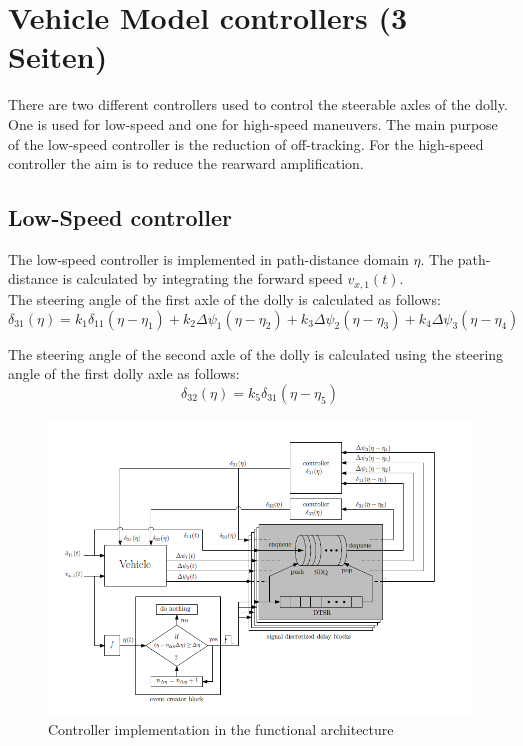 \documentclass[ExampleMasters.tex]{subfiles}
\begin{document}
\clearpage
\chapter{Vehicle Model controllers (3 Seiten)}
\label{chap:steering_model}
There are two different controllers used to control the steerable axles of the dolly. One is used for low-speed and one for high-speed maneuvers. The main purpose of the low-speed controller is the reduction of off-tracking.
For the high-speed controller the aim is to reduce the rearward amplification.
\section{Low-Speed controller}
\label{sec:low-speed_controller}
The low-speed controller is implemented in path-distance domain $\eta$. The path-distance is calculated by integrating the forward speed $v_{x,1}(t)$. \\
The steering angle of the first axle of the dolly is calculated as follows: 
\begin{equation}
\delta_{31}(\eta)=k_1\delta_{11}(\eta-\eta_1)+k_2\Delta\psi_1(\eta-\eta_2)+k_3\Delta\psi_2(\eta-\eta_3)+k_4\Delta\psi_3(\eta-\eta_4)
\end{equation}

\label{eq:delta31_lowspeed}

The steering angle of the second axle of the dolly is calculated using the steering angle of the first dolly axle as follows:
\begin{equation}
\delta_{32}(\eta)=k_5\delta_{31}(\eta-\eta_5)
\end{equation}
\label{eq:delta32_lowspeed}

\begin{figure}[h]
	\centering
	\includegraphics[width=1.0\linewidth]{figures/Low_speed_diagram}
	\caption[]{Controller implementation in the functional architecture \cite{Low-speed_paper}}
	
	\label{fig:low_speed_diagram}
\end{figure}
\end{document}
